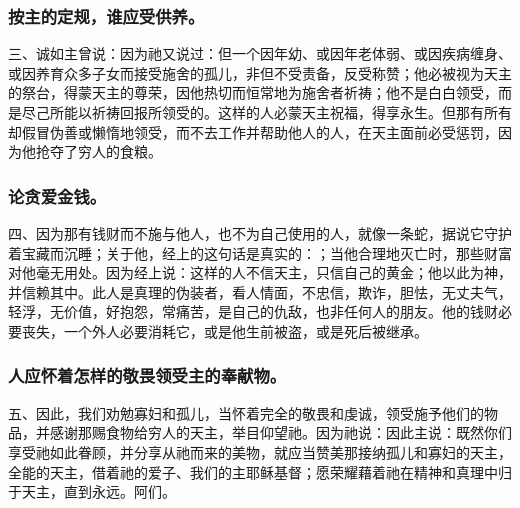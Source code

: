 
\subsubsection{按主的定规，谁应受供养。}

三、诚如主曾说：因为祂又说过：但一个因年幼、或因年老体弱、或因疾病缠身、或因养育众多子女而接受施舍的孤儿，非但不受责备，反受称赞；他必被视为天主的祭台，得蒙天主的尊荣，因他热切而恒常地为施舍者祈祷；他不是白白领受，而是尽己所能以祈祷回报所领受的。这样的人必蒙天主祝福，得享永生。但那有所有却假冒伪善或懒惰地领受，而不去工作并帮助他人的人，在天主面前必受惩罚，因为他抢夺了穷人的食粮。\par


\subsubsection{论贪爱金钱。}

四、因为那有钱财而不施与他人，也不为自己使用的人，就像一条蛇，据说它守护着宝藏而沉睡；关于他，经上的这句话是真实的：；当他合理地灭亡时，那些财富对他毫无用处。因为经上说：这样的人不信天主，只信自己的黄金；他以此为神，并信赖其中。此人是真理的伪装者，看人情面，不忠信，欺诈，胆怯，无丈夫气，轻浮，无价值，好抱怨，常痛苦，是自己的仇敌，也非任何人的朋友。他的钱财必要丧失，一个外人必要消耗它，或是他生前被盗，或是死后被继承。\par


\subsubsection{人应怀着怎样的敬畏领受主的奉献物。}

五、因此，我们劝勉寡妇和孤儿，当怀着完全的敬畏和虔诚，领受施予他们的物品，并感谢那赐食物给穷人的天主，举目仰望祂。因为祂说：因此主说：既然你们享受祂如此眷顾，并分享从祂而来的美物，就应当赞美那接纳孤儿和寡妇的天主，全能的天主，借着祂的爱子、我们的主耶稣基督；愿荣耀藉着祂在精神和真理中归于天主，直到永远。阿们。\par

